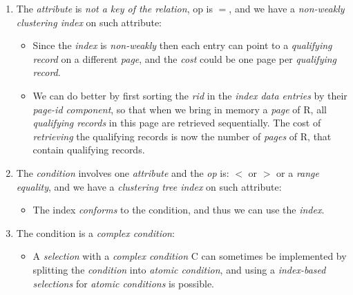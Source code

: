 \documentclass{article}
\begin{document}
\begin{enumerate}
\begin{itemize}
\end{itemize}
\item The \emph{attribute} is \emph{not a key of the relation}, op is $=$, and we have a \emph{non-weakly clustering index} on such attribute:
\begin{itemize}
\item Since the \emph{index} is \emph{non-weakly} then each entry can point to a \emph{qualifying record} on a different \emph{page}, and the \emph{cost} could be one page per \emph{qualifying record}. 
\item We can do better by first sorting the \emph{rid} in the \emph{index data entries} by their \emph{page-id component}, so that when we bring in memory a \emph{page} of R, all \emph{qualifying records} in this page are retrieved sequentially. The cost of \emph{retrieving} the qualifying records is now the number of \emph{pages} of R, that contain qualifying records. 
\end{itemize}
\item The \emph{condition} involves one \emph{attribute} and the \emph{op} is: $<$ or $>$ or a \emph{range equality}, and we have a \emph{clustering tree index} on such attribute:
\begin{itemize}
\item The index \emph{conforms} to the condition, and thus we can use the \emph{index}.
\end{itemize}
\item The condition is a \emph{complex condition}:
\begin{itemize}
\item A \emph{selection} with a \emph{complex condition} C can sometimes be implemented by splitting the \emph{condition} into \emph{atomic condition}, and using a \emph{index-based selections} for \emph{atomic conditions} is possible. 
\end{itemize}
\end{enumerate}
\end{document}
